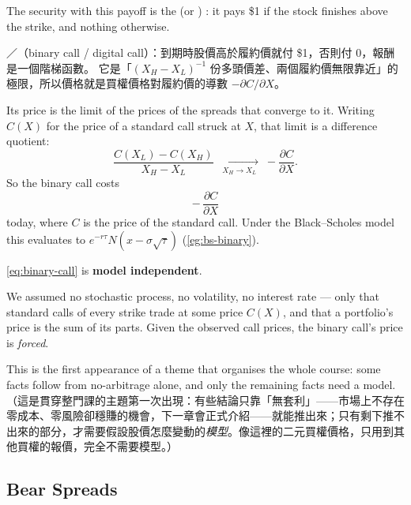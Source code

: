 \begin{definition}
	The security with this payoff is the  (or ) : it pays \$1 if the stock finishes above the strike, and nothing otherwise.
\end{definition}

\suppstart
\begin{remark}
	／（binary call / digital call）：到期時股價高於履約價就付 \$1，否則付 $0$，報酬是一個階梯函數。
	它是「$(X_{H}-X_{L})^{-1}$ 份多頭價差、兩個履約價無限靠近」的極限，所以價格就是買權價格對履約價的導數 $-\partial C/\partial X$。
\end{remark}

Its price is the limit of the prices of the spreads that converge to it.
Writing $C(X)$ for the price of a standard call struck at $X$, that limit is a difference quotient:
\[
	\frac{C(X_{L})-C(X_{H})}{X_{H}-X_{L}}
	\;\xrightarrow[\;X_{H}\to X_{L}\;]{}\;
	-\frac{\partial C}{\partial X} .
\]
\suppend
So the binary call costs
\begin{equation}
	-\,\frac{\partial C}{\partial X}
	\label{eq:binary-call}
\end{equation}
today, where $C$ is the price of the standard call.
\suppstart
Under the Black--Scholes model this evaluates to $e^{-r\tau}N(x-\sigma\sqrt{\tau})$ (\autoref{eg:bs-binary}).

\begin{moral}
	\eqref{eq:binary-call} is \textbf{model independent}.

	We assumed no stochastic process, no volatility, no interest rate --- only that standard calls of every strike trade at some price $C(X)$, and that a portfolio's price is the sum of its parts.
	Given the observed call prices, the binary call's price is \emph{forced}.

	This is the first appearance of a theme that organises the whole course: some facts follow from no-arbitrage alone, and only the remaining facts need a model.
	（這是貫穿整門課的主題第一次出現：有些結論只靠「無套利」——市場上不存在零成本、零風險卻穩賺的機會，下一章會正式介紹——就能推出來；只有剩下推不出來的部分，才需要假設股價怎麼變動的\emph{模型}。像這裡的二元買權價格，只用到其他買權的報價，完全不需要模型。）
\end{moral}
\suppend

\subsection{Bear Spreads}
\label{sec:bear-spreads}

